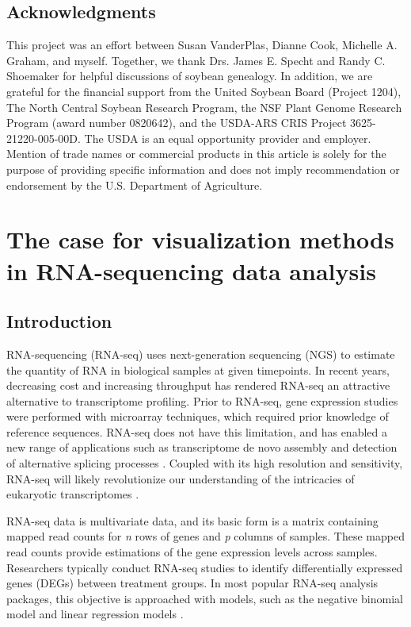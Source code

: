 \documentclass[11pt,a4paper,oldfontcommands,openany]{memoir}
\numberwithin{equation}{section} %
\begin{document}
\section{Acknowledgments}

This project was an effort between Susan VanderPlas, Dianne Cook, Michelle A. Graham, and myself. Together, we thank Drs. James E. Specht and Randy C. Shoemaker for helpful discussions of soybean genealogy. In addition, we are grateful for the financial support from the United Soybean Board (Project 1204), The North Central Soybean Research Program, the NSF Plant Genome Research Program (award number 0820642), and the USDA-ARS CRIS Project 3625-21220-005-00D. The USDA is an equal opportunity provider and employer. Mention of trade names or commercial products in this article is solely for the purpose of providing specific information and does not imply recommendation or endorsement by the U.S. Department of Agriculture.



\chapter{The case for visualization methods in RNA-sequencing data analysis}
\label{sec:chapter2}

\section{Introduction}

RNA-sequencing (RNA-seq) uses next-generation sequencing (NGS) to estimate the quantity of RNA in biological samples at given timepoints. In recent years, decreasing cost and increasing throughput has rendered RNA-seq an attractive alternative to transcriptome profiling. Prior to RNA-seq, gene expression studies were performed with microarray techniques, which required prior knowledge of reference sequences. RNA-seq does not have this limitation, and has enabled a new range of applications such as transcriptome de novo assembly \citep{Robertson} and detection of alternative splicing processes \citep{Anders2012, Pan}. Coupled with its high resolution and sensitivity, RNA-seq will likely revolutionize our understanding of the intricacies of eukaryotic transcriptomes \citep{Wang, Zhao}.

RNA-seq data is multivariate data, and its basic form is a matrix containing mapped read counts for \textit{n} rows of genes and \textit{p} columns of samples. These mapped read counts provide estimations of the gene expression levels across samples. Researchers typically conduct RNA-seq studies to identify differentially expressed genes (DEGs) between treatment groups. In most popular RNA-seq analysis packages, this objective is approached with models, such as the negative binomial model \citep{Anders2010, Trapnell2012, Trapnell2013, Robinson} and linear regression models \citep{Law}.
\end{document}
